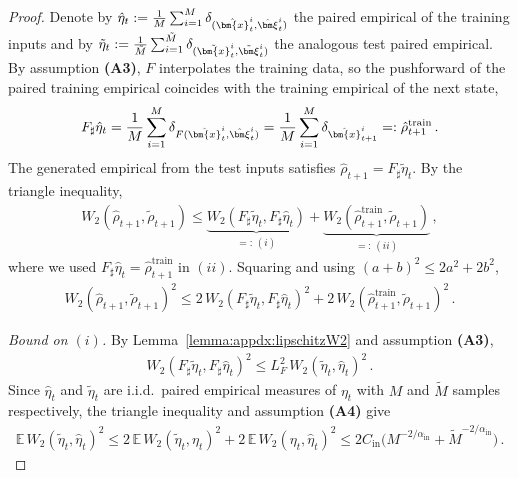 \documentclass{article}
\theoremstyle{plain}
\theoremstyle{definition}
\theoremstyle{remark}
\newcommand{\bfxi}{{\bm \xi}}
\newcommand{\bfx}{\bm{x}}
\begin{document}
\begin{proof}
  Denote by $\hat\eta_t := \tfrac{1}{M}\sum_{i=1}^{M} \delta_{(\hat\bfx_t^i,\hat\bfxi_t^i)}$ the paired empirical of the training inputs and by $\tilde\eta_t := \tfrac{1}{\tilde M}\sum_{i=1}^{\tilde M} \delta_{(\tilde\bfx_t^i,\tilde\bfxi_t^i)}$ the analogous test paired empirical. By assumption \textbf{(A3)}, $F$ interpolates the training data, so the pushforward of the paired training empirical coincides with the training empirical of the next state,
  \begin{align}
    F_\sharp \hat\eta_t = \frac{1}{M}\sum_{i=1}^{M} \delta_{F(\hat\bfx_t^i,\hat\bfxi_t^i)} = \frac{1}{M}\sum_{i=1}^{M} \delta_{\hat\bfx_{t+1}^i} =: \hat\rho_{t+1}^{\mathrm{train}}\,.
  \end{align}
  The generated empirical from the test inputs satisfies $\hat\rho_{t+1} = F_\sharp \tilde\eta_t$. By the triangle inequality,
  \begin{align}
    W_2( \hat\rho_{t+1}, \tilde\rho_{t+1} ) \leq
    \underbrace{W_2( F_\sharp \tilde\eta_t, F_\sharp \hat\eta_t )}_{=: \, (i)} +
    \underbrace{W_2( \hat\rho_{t+1}^{\mathrm{train}}, \tilde\rho_{t+1} )}_{=: \, (ii)}\,,
  \end{align}
  where we used $F_\sharp\hat\eta_t = \hat\rho_{t+1}^{\mathrm{train}}$ in $(ii)$. Squaring and using $(a+b)^2 \leq 2 a^2 + 2 b^2$,
  \begin{align}
    W_2( \hat\rho_{t+1}, \tilde\rho_{t+1} )^2 \leq 2\, W_2( F_\sharp \tilde\eta_t, F_\sharp \hat\eta_t )^2 + 2\, W_2( \hat\rho_{t+1}^{\mathrm{train}}, \tilde\rho_{t+1} )^2\,.
    \label{eq:appdx:triangle}
  \end{align}

  \emph{Bound on $(i)$.} By Lemma~\ref{lemma:appdx:lipschitzW2} and assumption \textbf{(A3)},
  \begin{align}
    W_2( F_\sharp \tilde\eta_t, F_\sharp \hat\eta_t )^2 \leq L_F^2 \, W_2( \tilde\eta_t, \hat\eta_t )^2\,.
  \end{align}
  Since $\hat\eta_t$ and $\tilde\eta_t$ are i.i.d.\ paired empirical measures of $\eta_t$ with $M$ and $\tilde M$ samples respectively, the triangle inequality and assumption \textbf{(A4)} give
  \begin{align}
    \mathbb E\,W_2( \tilde\eta_t, \hat\eta_t )^2 \leq 2\, \mathbb E\,W_2(\tilde\eta_t,\eta_t)^2 + 2\,\mathbb E\,W_2(\eta_t,\hat\eta_t)^2 \leq 2 C_{\mathrm{in}} \big( M^{-2/\alpha_{\mathrm{in}}} + \tilde M^{-2/\alpha_{\mathrm{in}}} \big)\,.
  \end{align}


\end{proof}
\end{document}
